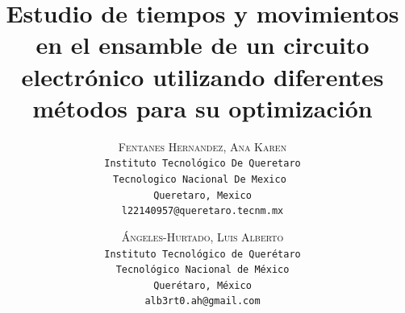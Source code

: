     \lfoot{ \thepage}
    
    \setlength{\droptitle}{-5\baselineskip} %
    \title{\textbf{Estudio de tiempos y movimientos en el ensamble de un circuito electrónico utilizando diferentes métodos para su optimización }} %
    
     \author{ 
     \textsc{Fentanes Hernandez, Ana Karen}\\ 
     \texttt{Instituto Tecnológico De Queretaro} \\ 
     \texttt{Tecnologico Nacional De Mexico } \\ 
     \texttt{Queretaro, Mexico}\\ 
     \texttt{l22140957@queretaro.tecnm.mx} 
     \and 
     \textsc{Ángeles-Hurtado, Luis Alberto}\\ 
     \texttt{ Instituto Tecnológico de Querétaro } \\ 
     \texttt{ Tecnológico Nacional de México } \\ 
     \texttt{Querétaro, México}\\ 
     \texttt{alb3rt0.ah@gmail.com} 
    }
    
    
    
    
